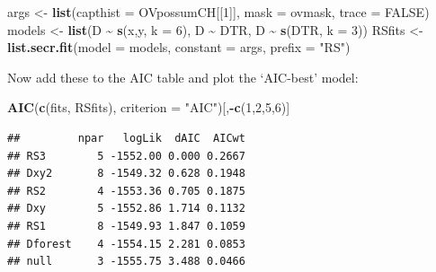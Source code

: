 \documentclass[
]{book}
\newenvironment{Shaded}{\begin{snugshade}}{\end{snugshade}}
\newcommand{\AttributeTok}[1]{\textcolor[rgb]{0.13,0.29,0.53}{#1}}
\newcommand{\ConstantTok}[1]{\textcolor[rgb]{0.56,0.35,0.01}{#1}}
\newcommand{\DecValTok}[1]{\textcolor[rgb]{0.00,0.00,0.81}{#1}}
\newcommand{\FunctionTok}[1]{\textcolor[rgb]{0.13,0.29,0.53}{\textbf{#1}}}
\newcommand{\NormalTok}[1]{#1}
\newcommand{\OtherTok}[1]{\textcolor[rgb]{0.56,0.35,0.01}{#1}}
\newcommand{\SpecialCharTok}[1]{\textcolor[rgb]{0.81,0.36,0.00}{\textbf{#1}}}
\newcommand{\StringTok}[1]{\textcolor[rgb]{0.31,0.60,0.02}{#1}}
\begin{document}
\begin{Shaded}
\begin{Highlighting}[]
\NormalTok{args }\OtherTok{\textless{}{-}} \FunctionTok{list}\NormalTok{(}\AttributeTok{capthist =}\NormalTok{ OVpossumCH[[}\DecValTok{1}\NormalTok{]], }\AttributeTok{mask =}\NormalTok{ ovmask, }\AttributeTok{trace =} 
    \ConstantTok{FALSE}\NormalTok{)}
\NormalTok{models }\OtherTok{\textless{}{-}} \FunctionTok{list}\NormalTok{(D }\SpecialCharTok{\textasciitilde{}} \FunctionTok{s}\NormalTok{(x,y, }\AttributeTok{k =} \DecValTok{6}\NormalTok{), D }\SpecialCharTok{\textasciitilde{}}\NormalTok{ DTR, D }\SpecialCharTok{\textasciitilde{}} \FunctionTok{s}\NormalTok{(DTR, }\AttributeTok{k =} \DecValTok{3}\NormalTok{))}
\NormalTok{RSfits }\OtherTok{\textless{}{-}} \FunctionTok{list.secr.fit}\NormalTok{(}\AttributeTok{model =}\NormalTok{ models, }\AttributeTok{constant =}\NormalTok{ args, }
    \AttributeTok{prefix =} \StringTok{"RS"}\NormalTok{)}
\end{Highlighting}
\end{Shaded}

Now add these to the AIC table and plot the `AIC-best' model:

\begin{Shaded}
\begin{Highlighting}[]
\FunctionTok{AIC}\NormalTok{(}\FunctionTok{c}\NormalTok{(fits, RSfits), }\AttributeTok{criterion =} \StringTok{"AIC"}\NormalTok{)[,}\SpecialCharTok{{-}}\FunctionTok{c}\NormalTok{(}\DecValTok{1}\NormalTok{,}\DecValTok{2}\NormalTok{,}\DecValTok{5}\NormalTok{,}\DecValTok{6}\NormalTok{)]}
\end{Highlighting}
\end{Shaded}

\begin{verbatim}
##         npar   logLik  dAIC  AICwt
## RS3        5 -1552.00 0.000 0.2667
## Dxy2       8 -1549.32 0.628 0.1948
## RS2        4 -1553.36 0.705 0.1875
## Dxy        5 -1552.86 1.714 0.1132
## RS1        8 -1549.93 1.847 0.1059
## Dforest    4 -1554.15 2.281 0.0853
## null       3 -1555.75 3.488 0.0466
\end{verbatim}
\end{document}
